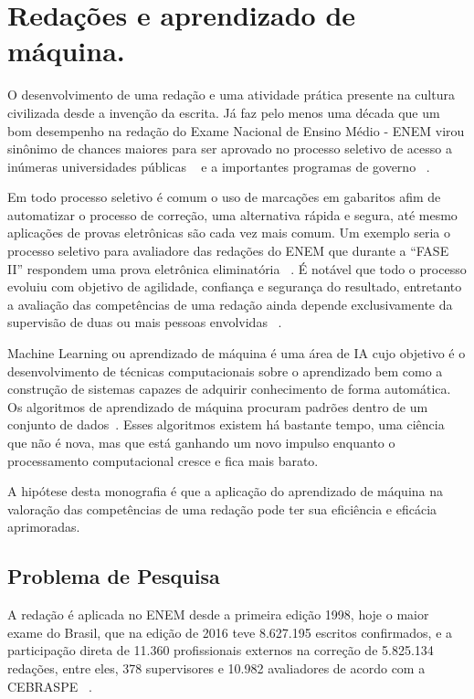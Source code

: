 \chapter{Redações e aprendizado de máquina.}\label{sec:intro}

O desenvolvimento de uma redação e uma atividade prática presente na cultura civilizada desde a invenção da escrita.
Já faz pelo menos uma década que um bom desempenho na redação do Exame Nacional de Ensino Médio - ENEM  virou sinônimo de chances maiores para ser aprovado no processo seletivo de acesso a inúmeras universidades públicas ~\cite{sisu:2017} e a importantes programas de governo ~\cite{csf:2017}.

Em todo processo seletivo é comum o uso de marcações em gabaritos afim de automatizar o processo de correção, uma alternativa rápida e segura, até mesmo aplicações de provas eletrônicas são cada vez mais comum. Um exemplo seria o processo seletivo para avaliadore das redações do ENEM que durante a ``FASE II'' respondem uma prova eletrônica eliminatória ~\cite{paq_a:2016}. É notável que todo o processo evoluiu com objetivo de agilidade, confiança e segurança do resultado, entretanto a avaliação das competências de uma redação ainda depende exclusivamente da supervisão de duas ou mais pessoas envolvidas ~\cite{edital_enem:2016}.

Machine Learning ou aprendizado de máquina é uma área de IA cujo objetivo é o desenvolvimento de técnicas computacionais sobre o aprendizado bem como a construção de sistemas capazes de adquirir conhecimento de forma automática. Os algoritmos de aprendizado de máquina procuram padrões dentro de um conjunto de dados~\cite{machine_learning:1997}. Esses algoritmos existem há bastante tempo, uma ciência que não é nova, mas que está ganhando um novo impulso enquanto o processamento computacional cresce e fica mais barato.

A hipótese desta monografia é que a aplicação do aprendizado de máquina na valoração das competências de uma redação pode ter sua eficiência e eficácia aprimoradas.

\section{Problema de Pesquisa}

A redação é aplicada no ENEM desde a primeira edição 1998, hoje o maior exame do Brasil, que na edição de 2016 teve 8.627.195 escritos confirmados, e a participação direta de 11.360 profissionais externos na correção de 5.825.134 redações, entre eles, 378 supervisores e 10.982 avaliadores de acordo com a CEBRASPE ~\cite{relatorio_de_gestao:2016}. 


